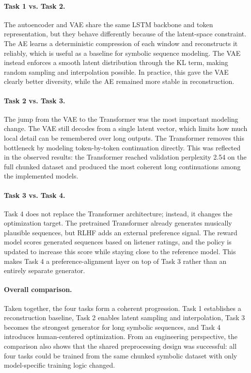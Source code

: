 \documentclass{article}
\begin{document}
\paragraph{Task 1 vs. Task 2.}
The autoencoder and VAE share the same LSTM backbone and token representation, but they behave differently because of the latent-space constraint. The AE learns a deterministic compression of each window and reconstructs it reliably, which is useful as a baseline for symbolic sequence modeling. The VAE instead enforces a smooth latent distribution through the KL term, making random sampling and interpolation possible. In practice, this gave the VAE clearly better diversity, while the AE remained more stable in reconstruction.

\paragraph{Task 2 vs. Task 3.}
The jump from the VAE to the Transformer was the most important modeling change. The VAE still decodes from a single latent vector, which limits how much local detail can be remembered over long outputs. The Transformer removes this bottleneck by modeling token-by-token continuation directly. This was reflected in the observed results: the Transformer reached validation perplexity 2.54 on the full chunked dataset and produced the most coherent long continuations among the implemented models.

\paragraph{Task 3 vs. Task 4.}
Task 4 does not replace the Transformer architecture; instead, it changes the optimization target. The pretrained Transformer already generates musically plausible sequences, but RLHF adds an external preference signal. The reward model scores generated sequences based on listener ratings, and the policy is updated to increase this score while staying close to the reference model. This makes Task 4 a preference-alignment layer on top of Task 3 rather than an entirely separate generator.

\paragraph{Overall comparison.}
Taken together, the four tasks form a coherent progression. Task 1 establishes a reconstruction baseline, Task 2 enables latent sampling and interpolation, Task 3 becomes the strongest generator for long symbolic sequences, and Task 4 introduces human-centered optimization. From an engineering perspective, the comparison also shows that the shared preprocessing design was successful: all four tasks could be trained from the same chunked symbolic dataset with only model-specific training logic changed.
\end{document}

